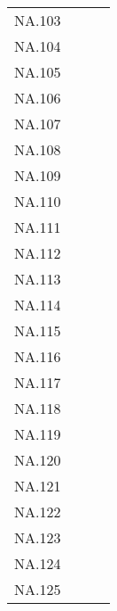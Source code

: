 \begin{table}[ht]
\begin{tabular}{rrrr}
  NA.103 &  &  &  \\ 
  NA.104 &  &  &  \\ 
  NA.105 &  &  &  \\ 
  NA.106 &  &  &  \\ 
  NA.107 &  &  &  \\ 
  NA.108 &  &  &  \\ 
  NA.109 &  &  &  \\ 
  NA.110 &  &  &  \\ 
  NA.111 &  &  &  \\ 
  NA.112 &  &  &  \\ 
  NA.113 &  &  &  \\ 
  NA.114 &  &  &  \\ 
  NA.115 &  &  &  \\ 
  NA.116 &  &  &  \\ 
  NA.117 &  &  &  \\ 
  NA.118 &  &  &  \\ 
  NA.119 &  &  &  \\ 
  NA.120 &  &  &  \\ 
  NA.121 &  &  &  \\ 
  NA.122 &  &  &  \\ 
  NA.123 &  &  &  \\ 
  NA.124 &  &  &  \\ 
  NA.125 &  &  &  \\ 
   \hline
\end{tabular}
\end{table}
